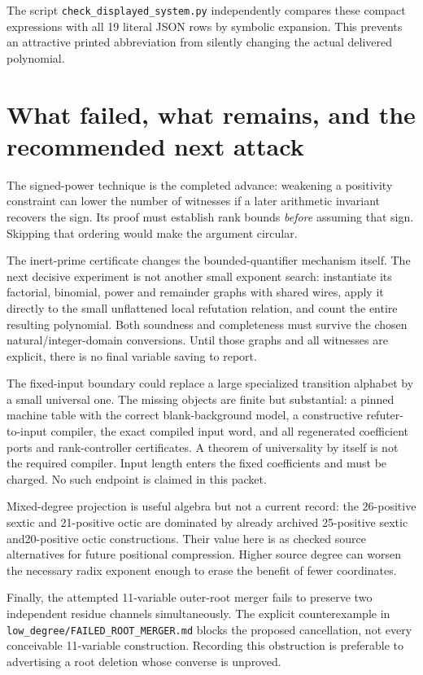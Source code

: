 \documentclass[11pt]{article}
\begin{document}
The script \texttt{check\_displayed\_system.py} independently compares these
compact expressions with all 19 literal JSON rows by symbolic expansion.
This prevents an attractive printed abbreviation from silently changing
the actual delivered polynomial.





\section{What failed, what remains, and the recommended next attack}
The signed-power technique is the completed advance: weakening a positivity
constraint can lower the number of witnesses if a later arithmetic invariant
recovers the sign. Its proof must establish rank bounds \emph{before} assuming
that sign. Skipping that ordering would make the argument circular.

The inert-prime certificate changes the bounded-quantifier mechanism itself.
The next decisive experiment is not another small exponent search: instantiate
its factorial, binomial, power and remainder graphs with shared wires, apply
it directly to the small unflattened local refutation relation, and count the
entire resulting polynomial. Both soundness and completeness must survive
the chosen natural/integer-domain conversions. Until those graphs and all
witnesses are explicit, there is no final variable saving to report.

The fixed-input boundary could replace a large specialized transition
alphabet by a small universal one. The missing objects are finite but
substantial: a pinned machine table with the correct blank-background model,
a constructive refuter-to-input compiler, the exact compiled input word,
and all regenerated coefficient ports and rank-controller certificates.
A theorem of universality by itself is not the required compiler. Input
length enters the fixed coefficients and must be charged. No such endpoint
is claimed in this packet.

Mixed-degree projection is useful algebra but not a current record: the
26-positive sextic and 21-positive octic are dominated by already archived
25-positive sextic and20-positive octic constructions. Their value here is
as checked source alternatives for future positional compression. Higher
source degree can worsen the necessary radix exponent enough to erase the
benefit of fewer coordinates.

Finally, the attempted 11-variable outer-root merger fails to preserve two
independent residue channels simultaneously. The explicit counterexample in
\texttt{low\_degree/FAILED\_ROOT\_MERGER.md} blocks the proposed cancellation,
not every conceivable 11-variable construction. Recording this obstruction
is preferable to advertising a root deletion whose converse is unproved.
\end{document}
